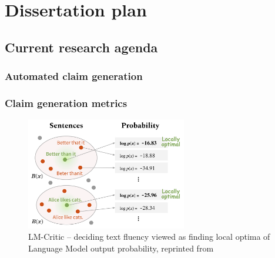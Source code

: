 
\chapter{Dissertation plan}
\label{chap:plan}


\section{Current research agenda}
\subsection{Automated claim generation}
\todo{}
\subsection{Claim generation metrics}

\begin{figure}
    \includegraphics[width=7cm]{fig/lm_critics.png}
    \caption{\textsf{LM-Critic} -- deciding text fluency viewed as finding local optima of Language Model output probability, reprinted from~\cite{yasunaga-etal-2021-lm}}
    \label{fig:gptext}
\end{figure}
\label{sec:metrics}

